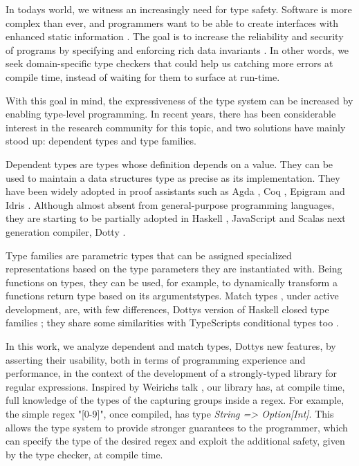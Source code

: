 In today\textquotesingle s world, we witness an increasingly need for type safety. Software is more complex than ever, and programmers want to be able to create interfaces with enhanced static information \cite{why-dependent-types-matter}. The goal is to increase the reliability and security of programs by specifying and enforcing rich data invariants \cite{dynamic-typing-with-dependent}. In other words, we seek domain-specific type checkers that could help us catching more errors at compile time, instead of waiting for them to surface at run-time.

With this goal in mind, the expressiveness of the type system can be increased by enabling type-level programming. In recent years, there has been considerable interest in the research community for this topic, and two solutions have mainly stood up: dependent types and type families.

Dependent types are types whose definition depends on a value. They can be used to maintain a data structure\textquotesingle s type as precise as its implementation. They have been widely adopted in proof assistants such as Agda \cite{agda}, Coq \cite{coq}, Epigram \cite{epigram} and Idris \cite{idris}. Although almost absent from general-purpose programming languages, they are starting to be partially adopted in Haskell \cite{dependent-types-eisenberg}, JavaScript \cite{dependent-javascript} and Scala\textquotesingle s next generation compiler, Dotty \cite{dependent-types-for-humans}. 

Type families are parametric types that can be assigned specialized representations based on the type parameters they are instantiated with. Being functions on types, they can be used, for example, to dynamically transform a function\textquotesingle s return type based on its arguments\textquotesingle \space types. Match types \cite{match-types-website}, under active development, are, with few differences, Dotty\textquotesingle s version of Haskell closed type families \cite{type-families}; they share some similarities with TypeScript\textquotesingle s conditional types too \cite{typescript-conditional}.

In this  work, we analyze dependent and match types, Dotty\textquotesingle s new features, by asserting their usability, both in terms of programming experience and performance, in the context of the development of a strongly-typed library for regular expressions. Inspired by Weirich\textquotesingle s talk \cite{wierich-talk}, our library has, at compile time, full knowledge of the types of the capturing groups inside a regex. For example, the simple regex "[0-9]", once compiled, has type \textit{String => Option[Int]}. This allows the type system to provide stronger guarantees to the programmer, which can specify the type of the desired regex and exploit the additional safety, given by the type checker, at compile time.

